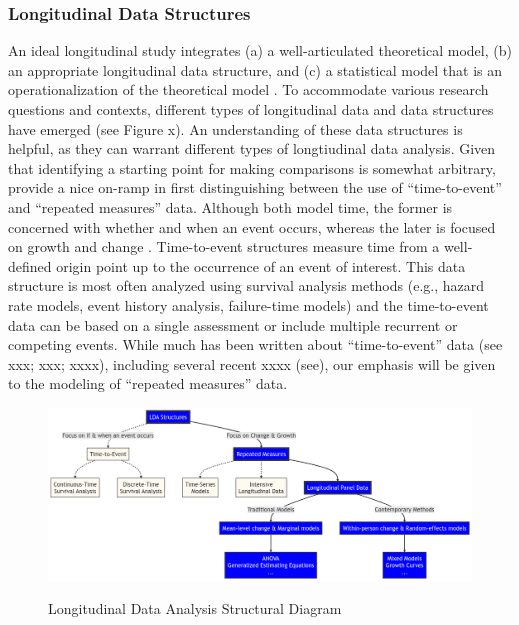 \documentclass[
  number,
  preprint,
  3p,
  twocolumn]{elsarticle}
\begin{document}
\hypertarget{longitudinal-data-structures}{%
\subsubsection{Longitudinal Data
Structures}\label{longitudinal-data-structures}}

An ideal longitudinal study integrates (a) a well-articulated
theoretical model, (b) an appropriate longitudinal data structure, and
(c) a statistical model that is an operationalization of the theoretical
model \citep{collins2006}. To accommodate various research questions and
contexts, different types of longitudinal data and data structures have
emerged (see Figure x). An understanding of these data structures is
helpful, as they can warrant different types of longtiudinal data
analysis. Given that identifying a starting point for making comparisons
is somewhat arbitrary, \citep{bauer2019} provide a nice on-ramp in first
distinguishing between the use of ``time-to-event'' and ``repeated
measures'' data. Although both model time, the former is concerned with
whether and when an event occurs, whereas the later is focused on growth
and change \citep{bauer2019}. Time-to-event structures measure time from
a well-defined origin point up to the occurrence of an event of
interest. This data structure is most often analyzed using survival
analysis methods (e.g., hazard rate models, event history analysis,
failure-time models) and the time-to-event data can be based on a single
assessment or include multiple recurrent or competing events. While much
has been written about ``time-to-event'' data (see xxx; xxx; xxxx),
including several recent xxxx (see), our emphasis will be given to the
modeling of ``repeated measures'' data.

\begin{figure}

{\centering 

\href{https://centerstat.org/resources/}{\includegraphics{./figures/LDAStructure2.png}}

}

\caption{Longitudinal Data Analysis Structural Diagram}

\end{figure}
\end{document}
